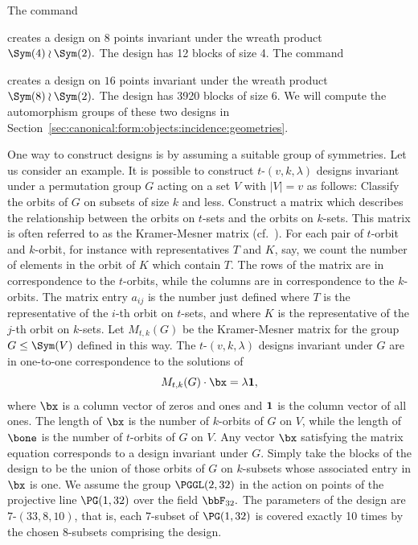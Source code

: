 The command 
{\tt

}
creates a design on $8$ points invariant under the wreath product $\Sym(4) \wr \Sym(2).$
The design has 12 blocks of size 4. 
The command 
{\tt

}
creates a design on $16$ points invariant under the wreath product $\Sym(8) \wr \Sym(2).$
The design has 3920 blocks of size 6. 
We will compute the automorphism groups of these two designs in Section~\ref{sec:canonical:form:objects:incidence:geometries}.


\bigskip

One way to construct designs is by assuming a suitable group of symmetries. 
Let us consider an example. 
It is possible to construct $t$-$(v,k,\lambda)$ designs invariant under a permutation group $G$ 
acting on a set $V$ with $|V| = v$ as follows: 
Classify the orbits of $G$ on subsets of size $k$ and less. 
Construct a matrix which describes the relationship between the orbits on $t$-sets and the orbits on $k$-sets. 
This matrix is often referred to as the Kramer-Mesner matrix (cf.~\cite{KramerMesner76}).
For each pair of $t$-orbit and $k$-orbit, for instance with representatives $T$ and $K$, say, 
we count the number of elements in the orbit of $K$ which contain $T$. 
The rows of the matrix are in correspondence to the $t$-orbits, while the columns are in correspondence to the $k$-orbits. 
The matrix entry $a_{ij}$ is the number just defined where $T$ is the representative of the 
$i$-th orbit on $t$-sets,  and where $K$ is the representative of the $j$-th orbit on $k$-sets. 
Let $M_{t,k}(G)$ be the Kramer-Mesner matrix 
for the group $G \le \Sym(V)$ defined in this way. 
The 
$t$-$(v,k,\lambda)$ designs invariant under $G$ are in one-to-one correspondence to the solutions of 
$$
M_{t,k}(G)\cdot \bx = \lambda {\bf 1},
$$
where $\bx$ is a column vector of zeros and ones and ${\bf 1}$ is the column vector of all ones.
The length of $\bx$ is the number of $k$-orbits of $G$ on $V$, 
while the length of $\bone$ is the number of $t$-orbits of $G$ on $V$. 
Any vector $\bx$ satisfying the matrix equation corresponds to a design invariant under $G$.
Simply take the  blocks of the design to be the union of those orbits of $G$ on $k$-subsets 
whose associated entry in $\bx$ is one.
We assume the group $\PGGL(2,32)$ in the action on points of the projective line $\PG(1,32)$ 
over the field $\bbF_{32}.$
The parameters of the design are $7$-$(33,8,10)$, that is, each $7$-subset of $\PG(1,32)$
is covered exactly 10 times by the chosen $8$-subsets comprising the design.
